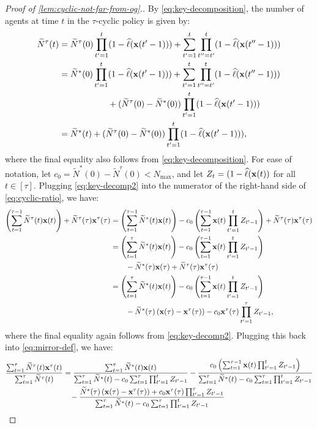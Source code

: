 \documentclass[12pt]{article}
\begin{document}
\begin{proof}[Proof of \cref{lem:cyclic-not-far-from-og}.]
By \eqref{eq:key-decomposition}, the number of agents at time $t$ in the $\tau$-cyclic policy is given by:
\begin{align}\label{eq:key-decomp2}
    \widetilde{N}^\tau(t) &= \widetilde{N}^\tau(0) \prod_{t'=1}^t (1-\widehat{\ell}(\mathbf{x}(t'-1))) + \sum_{t'=1}^t \prod_{t''=t'}^t (1-\widehat{\ell}(\mathbf{x}(t''-1)))\notag \\
    &= \widetilde{N}^*(0)\prod_{t'=1}^t (1-\widehat{\ell}(\mathbf{x}(t'-1))) + \sum_{t'=1}^t \prod_{t''=t'}^t (1-\widehat{\ell}(\mathbf{x}(t''-1)))\notag \\ &\hspace{2cm}+ (\widetilde{N}^\tau(0) - \widetilde{N}^*(0))\prod_{t'=1}^t (1-\widehat{\ell}(\mathbf{x}(t'-1))) \notag \\
    &= \widetilde{N}^*(t) + (\widetilde{N}^\tau(0) - \widetilde{N}^*(0))\prod_{t'=1}^t (1-\widehat{\ell}(\mathbf{x}(t'-1))),
\end{align}
where the final equality also follows from \eqref{eq:key-decomposition}. For ease of notation, let $c_0 = \widetilde{N}^*(0)-\widetilde{N}^\tau(0) < N_{\max}$, and let $Z_t = (1-\widehat{\ell}(\mathbf{x}(t))$ for all $t \in [\tau]$. Plugging \eqref{eq:key-decomp2} into the numerator of the right-hand side of \eqref{eq:cyclic-ratio}, we have:
\begin{align}\label{eq:numerator}
    \left(\sum_{t=1}^{\tau-1} \widetilde{N}^\tau(t)\mathbf{x}(t)\right) + \widetilde{N}^\tau(\tau) \mathbf{x}^\tau(\tau) &= \left(\sum_{t=1}^{\tau-1} \widetilde{N}^*(t)\mathbf{x}(t)\right) - c_0 \left(\sum_{t=1}^{\tau-1} \mathbf{x}(t) \prod_{t'=1}^{t} Z_{t'-1} \right) + \widetilde{N}^\tau(\tau) \mathbf{x}^\tau(\tau)\notag \notag \\
    &= \left(\sum_{t=1}^{\tau} \widetilde{N}^*(t)\mathbf{x}(t)\right)- c_0 \left(\sum_{t=1}^{\tau-1} \mathbf{x}(t) \prod_{t'=1}^{t} Z_{t'-1} \right)\notag \\&\qquad - \widetilde{N}^*(\tau)\mathbf{x}(\tau)   + \widetilde{N}^\tau(\tau) \mathbf{x}^\tau(\tau) \notag \\
    &= \left(\sum_{t=1}^{\tau} \widetilde{N}^*(t)\mathbf{x}(t)\right)- c_0 \left(\sum_{t=1}^{\tau-1} \mathbf{x}(t) \prod_{t'=1}^{t} Z_{t'-1} \right)\notag \\&\qquad - \widetilde{N}^*(\tau)\left(\mathbf{x}(\tau)- \mathbf{x}^\tau(\tau)\right) - c_0\mathbf{x}^\tau(\tau)\prod_{t'=1}^{\tau} Z_{t'-1}, 
\end{align}
where the final equality again follows from \eqref{eq:key-decomp2}. Plugging this back into \eqref{eq:mirror-def}, we have:
\begin{align*}%
     &\frac{\sum_{t=1}^\tau \widetilde{N}^\tau(t)\bx^\tau(t)}{\sum_{t=1}^\tau\widetilde{N}^\tau(t)} = \frac{\sum_{t=1}^{\tau} \widetilde{N}^*(t)\bx(t)}{\sum_{t=1}^\tau \widetilde{N}^*(t) - c_0 \sum_{t=1}^\tau \prod_{t'=1}^t Z_{t'-1}} - \frac{c_0 \left(\sum_{t=1}^{\tau-1} \bx(t) \prod_{t'=1}^{t} Z_{t'-1} \right)}{\sum_{t=1}^\tau \widetilde{N}^*(t) - c_0 \sum_{t=1}^\tau \prod_{t'=1}^t Z_{t'-1}} \notag \\&\hspace{3cm}- \frac{ \widetilde{N}^*(\tau)\left(\bx(\tau)- \bx^\tau(\tau)\right) + c_0\bx^\tau(\tau)\prod_{t'=1}^{\tau} Z_{t'-1}}{\sum_{t=1}^\tau \widetilde{N}^*(t) - c_0 \sum_{t=1}^\tau \prod_{t'=1}^t Z_{t'-1}} \notag \\

\end{align*}
\end{proof}
\end{document}
